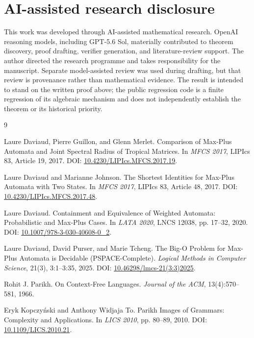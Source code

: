 \documentclass[11pt]{article}
\begin{document}
\section*{AI-assisted research disclosure}

This work was developed through AI-assisted mathematical research. OpenAI reasoning models, including GPT-5.6 Sol, materially contributed to theorem discovery, proof drafting, verifier generation, and literature-review support. The author directed the research programme and takes responsibility for the manuscript. Separate model-assisted review was used during drafting, but that review is provenance rather than mathematical evidence. The result is intended to stand on the written proof above; the public regression code is a finite regression of its algebraic mechanism and does not independently establish the theorem or its historical priority.

\begin{thebibliography}{9}
\small
\setlength{\itemsep}{0.35em}

Laure Daviaud, Pierre Guillon, and Glenn Merlet.
\newblock Comparison of Max-Plus Automata and Joint Spectral Radius of Tropical Matrices.
\newblock In \emph{MFCS 2017}, LIPIcs 83, Article 19, 2017.
\newblock DOI: \href{https://doi.org/10.4230/LIPIcs.MFCS.2017.19}{10.4230/LIPIcs.MFCS.2017.19}.

Laure Daviaud and Marianne Johnson.
\newblock The Shortest Identities for Max-Plus Automata with Two States.
\newblock In \emph{MFCS 2017}, LIPIcs 83, Article 48, 2017.
\newblock DOI: \href{https://doi.org/10.4230/LIPIcs.MFCS.2017.48}{10.4230/LIPIcs.MFCS.2017.48}.

Laure Daviaud.
\newblock Containment and Equivalence of Weighted Automata: Probabilistic and Max-Plus Cases.
\newblock In \emph{LATA 2020}, LNCS 12038, pp. 17--32, 2020.
\newblock DOI: \href{https://doi.org/10.1007/978-3-030-40608-0_2}{10.1007/978-3-030-40608-0\_2}.

Laure Daviaud, David Purser, and Marie Tcheng.
\newblock The Big-O Problem for Max-Plus Automata is Decidable (PSPACE-Complete).
\newblock \emph{Logical Methods in Computer Science}, 21(3), 3:1--3:35, 2025.
\newblock DOI: \href{https://doi.org/10.46298/lmcs-21(3:3)2025}{10.46298/lmcs-21(3:3)2025}.

Rohit J. Parikh.
\newblock On Context-Free Languages.
\newblock \emph{Journal of the ACM}, 13(4):570--581, 1966.

Eryk Kopczy\'nski and Anthony Widjaja To.
\newblock Parikh Images of Grammars: Complexity and Applications.
\newblock In \emph{LICS 2010}, pp. 80--89, 2010.
\newblock DOI: \href{https://doi.org/10.1109/LICS.2010.21}{10.1109/LICS.2010.21}.

\end{thebibliography}
\end{document}
